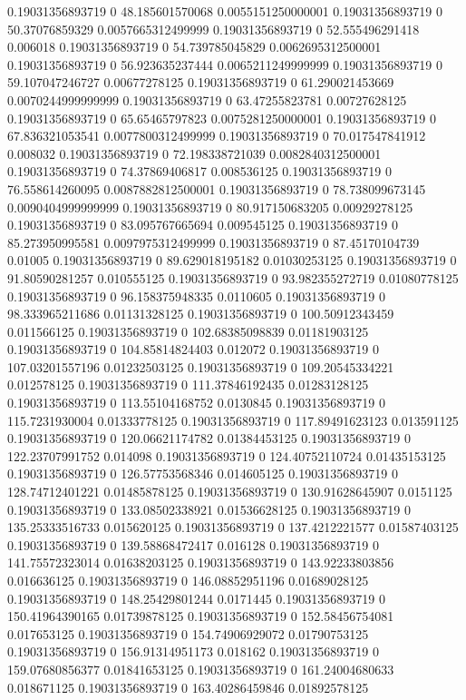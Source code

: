 0.19031356893719 0 48.185601570068 0.0055151250000001
0.19031356893719 0 50.37076859329 0.0057665312499999
0.19031356893719 0 52.555496291418 0.006018
0.19031356893719 0 54.739785045829 0.0062695312500001
0.19031356893719 0 56.923635237444 0.0065211249999999
0.19031356893719 0 59.107047246727 0.00677278125
0.19031356893719 0 61.290021453669 0.0070244999999999
0.19031356893719 0 63.47255823781 0.00727628125
0.19031356893719 0 65.65465797823 0.0075281250000001
0.19031356893719 0 67.836321053541 0.0077800312499999
0.19031356893719 0 70.017547841912 0.008032
0.19031356893719 0 72.198338721039 0.0082840312500001
0.19031356893719 0 74.37869406817 0.008536125
0.19031356893719 0 76.558614260095 0.0087882812500001
0.19031356893719 0 78.738099673145 0.0090404999999999
0.19031356893719 0 80.917150683205 0.00929278125
0.19031356893719 0 83.095767665694 0.009545125
0.19031356893719 0 85.273950995581 0.0097975312499999
0.19031356893719 0 87.45170104739 0.01005
0.19031356893719 0 89.629018195182 0.01030253125
0.19031356893719 0 91.80590281257 0.010555125
0.19031356893719 0 93.982355272719 0.01080778125
0.19031356893719 0 96.158375948335 0.0110605
0.19031356893719 0 98.333965211686 0.01131328125
0.19031356893719 0 100.50912343459 0.011566125
0.19031356893719 0 102.68385098839 0.01181903125
0.19031356893719 0 104.85814824403 0.012072
0.19031356893719 0 107.03201557196 0.01232503125
0.19031356893719 0 109.20545334221 0.012578125
0.19031356893719 0 111.37846192435 0.01283128125
0.19031356893719 0 113.55104168752 0.0130845
0.19031356893719 0 115.7231930004 0.01333778125
0.19031356893719 0 117.89491623123 0.013591125
0.19031356893719 0 120.06621174782 0.01384453125
0.19031356893719 0 122.23707991752 0.014098
0.19031356893719 0 124.40752110724 0.01435153125
0.19031356893719 0 126.57753568346 0.014605125
0.19031356893719 0 128.74712401221 0.01485878125
0.19031356893719 0 130.91628645907 0.0151125
0.19031356893719 0 133.08502338921 0.01536628125
0.19031356893719 0 135.25333516733 0.015620125
0.19031356893719 0 137.4212221577 0.01587403125
0.19031356893719 0 139.58868472417 0.016128
0.19031356893719 0 141.75572323014 0.01638203125
0.19031356893719 0 143.92233803856 0.016636125
0.19031356893719 0 146.08852951196 0.01689028125
0.19031356893719 0 148.25429801244 0.0171445
0.19031356893719 0 150.41964390165 0.01739878125
0.19031356893719 0 152.58456754081 0.017653125
0.19031356893719 0 154.74906929072 0.01790753125
0.19031356893719 0 156.91314951173 0.018162
0.19031356893719 0 159.07680856377 0.01841653125
0.19031356893719 0 161.24004680633 0.018671125
0.19031356893719 0 163.40286459846 0.01892578125
